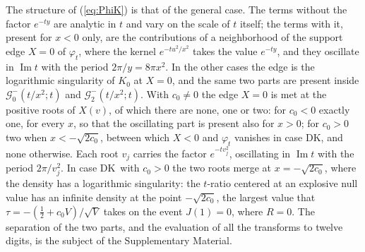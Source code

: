 \documentclass[ecta,nameyear,final]{econsocart}
\newcommand{\Ima}{\operatorname{Im}}
\newcommand{\Fk}{\textsf{\upshape DK}}
\newcommand{\cG}{\mathcal{G}}
\theoremstyle{plain}
\theoremstyle{definition}
\begin{document}
The structure of (\ref{eq:PhiK}) is that of the general case.  The terms without the factor $e^{-ty}$ are analytic in $t$ and vary on the scale of $t$ itself; the terms with it, present for $x<0$ only, are the contributions of a neighborhood of the support edge $X=0$ of $\varphi_t$, where the kernel $e^{-tu^2/x^2}$ takes the value $e^{-ty}$, and they oscillate in $\Ima t$ with the period $2\pi/y=8\pi x^2$.  In the other cases the edge is the logarithmic singularity of $K_0$ at $X=0$, and the same two parts are present inside $\cG^-_0(t/x^2;t)$ and $\cG^-_2(t/x^2;t)$.  With $c_0\ne0$ the edge $X=0$ is met at the positive roots of $X(v)$, of which there are none, one or two: for $c_0<0$ exactly one, for every $x$, so that the oscillating part is present also for $x>0$; for $c_0>0$ two when $x<-\sqrt{2c_0}$, between which $X<0$ and $\varphi_t$ vanishes in case \Fk, and none otherwise.  Each root $v_j$ carries the factor $e^{-tv_j^2}$, oscillating in $\Ima t$ with the period $2\pi/v_j^2$.  In case \Fk\ with $c_0>0$ the two roots merge at $x=-\sqrt{2c_0}$, where the density has a logarithmic singularity: the $t$-ratio centered at an explosive null value has an infinite density at the point $-\sqrt{2c_0}$, the largest value that $\tau=-(\frac12+c_0V)/\sqrt V$ takes on the event $J(1)=0$, where $R=0$.  The separation of the two parts, and the evaluation of all the transforms to twelve digits, is the subject of the Supplementary Material.
\end{document}
